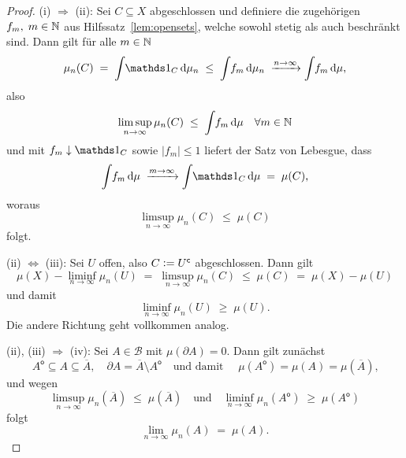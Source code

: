 \documentclass[../main/main.tex]{subfiles}
\begin{document}
	\begin{proof}
		(i) $\Rightarrow$ (ii): Sei $C \subseteq X$ abgeschlossen und definiere 
		die zugehörigen $f_m, \; m \in \mathbb{N}$ aus Hilfssatz~\ref{lem:opensets}, 
		welche sowohl stetig als auch beschränkt sind.
		Dann gilt für alle $m \in \mathbb{N}$
		$$\mu_n(C) \; = \; \measureint{}{\indfct_C}{\mu_n} \; \leq \; 
			\measureint{}{f_m}{\mu_n} \; \xrightarrow{n \to \infty} 
			\measureint{}{f_m}{\mu} \text{,}$$
		also 
		$$\limsup_{n \to \infty} \mu_n(C) \; \leq \; 
			\int_{} \, f_m \, \mathrm{d}\mu \quad \forall m \in \mathbb{N}$$
		und mit $f_m \convdown \indfct_C$ sowie $| f_m | \leq 1$ 
		liefert der Satz von Lebesgue, dass
		$$\measureint{}{f_m}{\mu} \; \xrightarrow{m \to \infty} 
			\measureint{}{\indfct_C}{\mu} \; = \; \mu(C) \text{,}$$
		woraus
		$$\limsup_{n \to \infty} \mu_n(C) \; \leq \; \mu(C)$$
		folgt.
		
		(ii) $\Leftrightarrow$ (iii): Sei $U$ offen, also 
		$C \vcentcolon = U^\mathsf{c}$ abgeschlossen. Dann gilt
		$$\mu(X) - \liminf_{n \to \infty} \mu_n(U) \; = \; 
			\limsup_{n \to \infty} \mu_n(C) \; \leq \; 
			\mu(C) \; = \; \mu(X) - \mu(U)$$
		und damit 
		$$\liminf_{n \to \infty} \mu_n(U) \; \geq \; \mu(U) \text{.}$$
		Die andere Richtung geht vollkommen analog.
		
		(ii), (iii) $\Rightarrow$ (iv): Sei $A \in \mathcal{B}$ mit 
		$\mu(\partial A) = 0$. Dann gilt zunächst
		$$A^\mathsf{o} \subseteq A \subseteq \overline{A}, \quad 
			\partial A = \overline{A} \setminus A^\mathsf{o} \quad 
			\text{und damit } \quad \mu(A^\mathsf{o}) = 
			\mu(A) = \mu(\overline{A}) \text{,}$$
		und wegen 
		$$\limsup_{n \to \infty} \mu_n(\overline{A}) \; \leq \; 
			\mu(\overline{A}) \quad \text{und} \quad 
			\liminf_{n \to \infty} \mu_n(A^\mathsf{o}) \; \geq \; 
			\mu(A^\mathsf{o})$$
		folgt
		$$\lim_{n \to \infty} \mu_n(A) \; = \; \mu(A) \text{.}$$
		

\end{proof}
\end{document}
